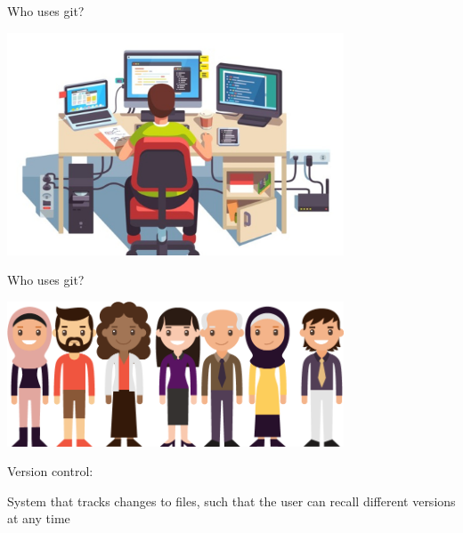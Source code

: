 \documentclass[12pt]{beamer}
\begin{document}
\begin{frame}

	\begin{flushright}
		\Large \textcolor{boss2}{Who uses git?} 
	\end{flushright}
	
	\begin{center}
	  \includegraphics[width=0.75\textwidth]{figs/stereotype.jpg}
	\end{center}

\end{frame}




\begin{frame}

	\begin{flushright}
		\Large \textcolor{boss2}{Who uses git?} 
	\end{flushright}
	
	\begin{center}
	  \includegraphics[width=0.75\textwidth]{figs/everyone.png}
	\end{center}

\end{frame}





\begin{frame}

	\Large \textcolor{boss3}{Version control:} \\

	\bigskip
	\bigskip

	\textcolor{boss4}{System that tracks changes to files, such that the user can recall different versions at any time}


\end{frame}
\end{document}
